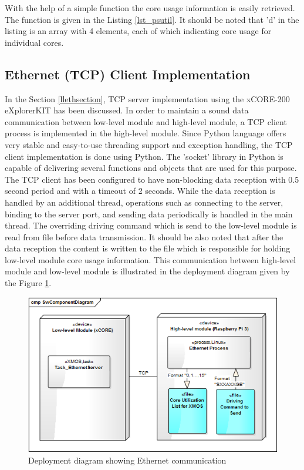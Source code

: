 With the help of a simple function the core usage information is easily retrieved. The function is given in the Listing \ref{lst_psutil}. It should be noted that 'd' in the listing is an array with 4 elements, each of which indicating core usage for individual cores.



\subsection{Ethernet (TCP) Client Implementation}
In the Section \ref{llethsection}, TCP server implementation using the xCORE-200 eXplorerKIT has been discussed. In order to maintain a sound data communication between low-level module and high-level module, a TCP client process is implemented in the high-level module. Since Python language offers very stable and easy-to-use threading support and exception handling, the TCP client implementation is done using Python. The 'socket' library \cite{socketpython} in Python is capable of delivering several functions and objects that are used for this purpose. The TCP client has been configured to have non-blocking data reception with 0.5 second period and with a timeout of 2 seconds. While the data reception is handled by an additional thread, operations such as connecting to the server, binding to the server port, and sending data periodically is handled in the main thread. The overriding driving command which is send to the low-level module is read from file before data transmission. It should be also noted that after the data reception the content is written to the file which is responsible for holding low-level module core usage information. This communication between high-level module and low-level module is illustrated in the deployment diagram given by the Figure \ref{fig:ethernetdeployment}.

\begin{figure}[!ht]
	\centering
	\captionsetup{justification=centering}
	\includegraphics[scale=0.7]{content/images/ethernetdeployment.png}
	\caption{Deployment diagram showing Ethernet communication}
	\label{fig:ethernetdeployment}
\end{figure}

